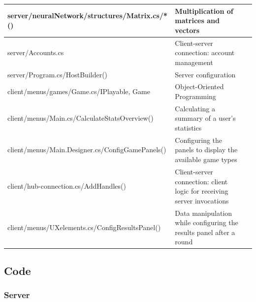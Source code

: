 \documentclass{article}
\begin{document}
\begin{table}[H]
\begin{tabularx}{\textwidth}{|L|L|p{1cm}|}
        server/neuralNetwork/\newline structures/Matrix.cs/*() & Multiplication of matrices and vectors & \pageref{server/neuralnetwork/structures/matrix.cs} \\\hline
		server/\newline Accounts.cs & Client-server connection: account management &\pageref{server/accounts.cs} \\\hline
        server/\newline Program.cs/HostBuilder() & Server configuration &\pageref{server/program.cs} \\\hline

        client/menus/games/\newline Game.cs/IPlayable, Game & Object-Oriented Programming &\pageref{client/menus/games/game.cs} \\\hline
        client/menus/\newline Main.cs/CalculateStatsOverview() & Calculating a summary of a user's statistics &\pageref{client/menus/main.cs} \\\hline
        client/menus/\newline Main.Designer.cs/ConfigGamePanels() & Configuring the panels to display the available game types &\pageref{client/menus/main.designer.cs} \\\hline
        client/\newline hub-connection.cs/AddHandles() & Client-server connection: client logic for receiving server invocations  &\pageref{client/hub-connection.cs} \\\hline
		client/menus/\newline UXelements.cs/ConfigResultsPanel() & Data manipulation while configuring the results panel after a round &\pageref{client/menus/uxelements.cs} \\\hline

    	\end{tabularx}
\end{table}

\subsection{Code}

\subsubsection{Server}
\end{document}
